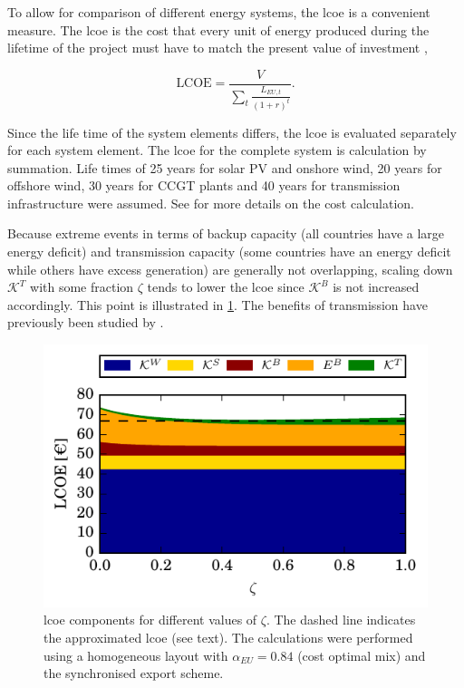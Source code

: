 \documentclass[a4paper, 5p, sort&compress]{elsarticle}%
\newcommand{\paren}[1]{\left(#1\right)}
\begin{document}
To allow for comparison of different energy systems, the \gls{lcoe} is a convenient measure. The \gls{lcoe} is the
cost that every unit of energy produced during the lifetime of the
project must have to match the present value of investment
\cite{Short1995},

\begin{equation}
  \label{eq:7}
  \text{LCOE} = \frac{V}{\sum_{t} \frac{L_{EU,
        t}}{\paren{1+r}^{t}}} .
\end{equation}

Since the life time of the system elements differs, the \gls{lcoe} is
evaluated separately for each system element. The \gls{lcoe} for the
complete system is calculation by summation. Life times of 25 years
for solar PV and onshore wind, 20 years for offshore wind, 30 years
for CCGT plants and 40 years for transmission infrastructure were
assumed. See \cite{Sensitivity} for more details on the cost
calculation.

Because extreme events in terms of backup capacity (all countries have
a large energy deficit) and transmission capacity (some countries have
an energy deficit while others have excess generation) are generally
not overlapping, scaling down $\mathcal{K}^{T}$ with some fraction
$\zeta$ tends to lower the \gls{lcoe} since $\mathcal{K}^{B}$ is not increased
accordingly. This point is illustrated in
\cref{fig:transmission-lcoe}. The benefits of transmission have
previously been studied by \cite{Rodriguez2013}.

\begin{figure}[h!]
  \centering
  \includegraphics[width = \columnwidth]{constrainedSync-new}
  \caption{\gls{lcoe} components for different values of $\zeta$. The dashed
    line indicates the approximated \gls{lcoe} (see text). The calculations
    were performed using a homogeneous layout with
    $\alpha_{EU} = 0.84$ (cost optimal mix) and the synchronised export
    scheme.}
  \label{fig:transmission-lcoe}
\end{figure}
\end{document}
